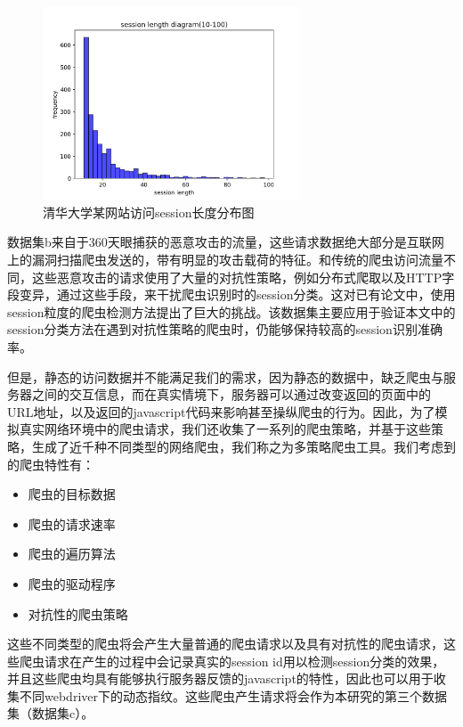 \documentclass[doctor,privacy,twoside]{buaa_mac}
\begin{document}
\centerline{}
\begin{figure}[!h]
  \centering
  \includegraphics[width=0.68\textwidth]{images/session_len_10_100.png}
  \caption{清华大学某网站访问session长度分布图}
  \label{fig:session_len}
\end{figure}
\centerline{}

数据集b来自于360天眼捕获的恶意攻击的流量，这些请求数据绝大部分是互联网上的漏洞扫描爬虫发送的，带有明显的攻击载荷的特征。和传统的爬虫访问流量不同，这些恶意攻击的请求使用了大量的对抗性策略，例如分布式爬取以及HTTP字段变异，通过这些手段，来干扰爬虫识别时的session分类。这对已有论文中，使用session粒度的爬虫检测方法提出了巨大的挑战。该数据集主要应用于验证本文中的session分类方法在遇到对抗性策略的爬虫时，仍能够保持较高的session识别准确率。

但是，静态的访问数据并不能满足我们的需求，因为静态的数据中，缺乏爬虫与服务器之间的交互信息，而在真实情境下，服务器可以通过改变返回的页面中的URL地址，以及返回的javascript代码来影响甚至操纵爬虫的行为。因此，为了模拟真实网络环境中的爬虫请求，我们还收集了一系列的爬虫策略，并基于这些策略，生成了近千种不同类型的网络爬虫，我们称之为多策略爬虫工具。我们考虑到的爬虫特性有：
\begin{itemize}
\item 爬虫的目标数据
\item 爬虫的请求速率
\item 爬虫的遍历算法
\item 爬虫的驱动程序
\item 对抗性的爬虫策略
\end{itemize}

这些不同类型的爬虫将会产生大量普通的爬虫请求以及具有对抗性的爬虫请求，这些爬虫请求在产生的过程中会记录真实的session id用以检测session分类的效果，并且这些爬虫均具有能够执行服务器反馈的javascript的特性，因此也可以用于收集不同webdriver下的动态指纹。这些爬虫产生请求将会作为本研究的第三个数据集（数据集c）。
\end{document}
